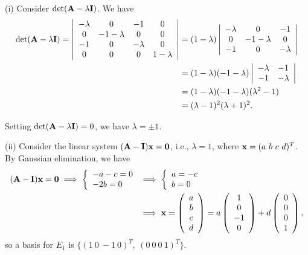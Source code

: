 \documentclass[12pt]{amsart}
\theoremstyle{plain}
\theoremstyle{definition}
\def\bf{\textbf}
\newcommand{\RA}{\implies}
\begin{document}
(i) Consider $\det(\bf A-\lambda\bf I)$. We have
\begin{align*}
	\det(\bf A-\lambda\bf I)=\left|
	\begin{array}{cccc}
		-\lambda & 0 & -1 & 0\\
		0 & -1-\lambda & 0 & 0\\
		-1 & 0 & -\lambda & 0\\
		0 & 0 & 0 & 1-\lambda\\
	\end{array}
	\right|&=
	(1-\lambda)
	\left|
	\begin{array}{cccc}
		-\lambda & 0 & -1\\
		0 & -1-\lambda & 0\\
		-1 & 0 & -\lambda\\
	\end{array}
	\right|\\
	&=(1-\lambda)(-1-\lambda)
	\left|
	\begin{array}{cccc}
		-\lambda & -1\\
		-1 & -\lambda\\
	\end{array}
	\right|\\
	&=(1-\lambda)(-1-\lambda)(\lambda^2-1)\\
	&=(\lambda-1)^2(\lambda+1)^2.
\end{align*}

Setting $\det(\bf A-\lambda\bf I)=0$, we have $\lambda=\pm1$.

(ii) Consider the linear system $(\bf A-\bf I)\bf x=\bf 0$, i.e., $\lambda=1$, where $\bf x=(a\ b\ c\ d)^T$. By Gaussian elimination, we have
\begin{align*}
	(\bf A-\bf I)\bf x=\bf 0\RA
	\left\{
	\begin{array}{l}
		-a-c=0\\
		-2b=0
	\end{array}
	\right.
	&\implies
	\left\{
	\begin{array}{l}
		a=-c\\
		b=0
	\end{array}
	\right.\\
	&\RA
	\bf x=
	\left(
	\begin{array}{c}
		a\\
		b\\
		c\\
		d
	\end{array}
	\right)=a\left(
	\begin{array}{c}
		1\\
		0\\
		-1\\
		0
	\end{array}
	\right)+d\left(
	\begin{array}{c}
		0\\
		0\\
		0\\
		1
	\end{array}
	\right),
\end{align*}
so a basis for $E_{1}$ is $\{(1\ 0\ -1\ 0)^T, \ (0\ 0\ 0\ 1)^T\}$.
\end{document}
